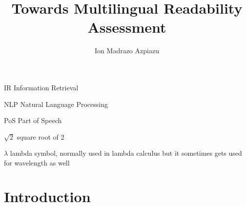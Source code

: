 \documentclass{bsu-ms}
\title{Towards Multilingual Readability Assessment}
\author{Ion Madrazo Azpiazu}
\begin{document}
\frontmatter  %

\buildFrontPages %

\begin{listAbbreviations}
  \item[IR] Information Retrieval
  \item[NLP] Natural Language Processing
  \item[PoS] Part of Speech
\end{listAbbreviations}


\begin{listSymbols}
  \item[$\sqrt{2}$] square root of 2
  \item[$\lambda$] lambda symbol, normally used in lambda calculus but
    it sometimes gets used for wavelength as well
\end{listSymbols}



\mainmatter


%
%

\chapter{Introduction}

\end{document}
